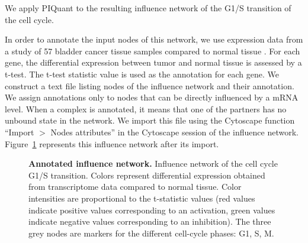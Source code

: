 \documentclass[10pt]{bmc_article}
\newenvironment{bmcformat}{\baselineskip20pt\sloppy\setboolean{publ}{false}}{\baselineskip20pt\sloppy}
\begin{document}
\begin{bmcformat}
We apply PIQuant to the resulting influence network of the G1/S transition of
the cell cycle. 

In order to annotate the input nodes of this network, we use expression  data
from a study of 57 bladder cancer
tissue samples compared to normal tissue \cite{stransky2006regional}. For each 
gene, the differential expression between tumor and normal tissue
is assessed by a t-test. The t-test statistic value is used as the annotation
for each gene. We construct a text file listing nodes of the influence network 
and their annotation. We assign annotations only to nodes that can be directly
influenced by a 
mRNA level. When a complex is annotated, it means that one of the partners has
no unbound state in the network. 
We import this file using the Cytoscape function 
``Import $>$ Nodes attributes'' 
in the Cytoscape session of the influence network.
Figure~\ref{InflAnnotNet} represents this influence network after its import.
 

\begin{figure}[h]
  \caption{\label{InflAnnotNet} \textbf{Annotated influence network.}
    Influence network of the cell cycle G1/S transition. Colors represent
differential
expression obtained from transcriptome data compared to normal tissue. Color 
intensities are proportional to the t-statistic values (red values indicate
positive values corresponding to an activation, green values indicate negative
values corresponding to an inhibition). The three grey nodes are markers for the
different cell-cycle phases: G1, S, M.}
\end{figure}


\end{bmcformat}
\end{document}
